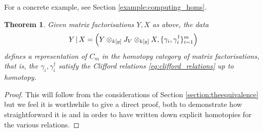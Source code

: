 \documentclass[english,letter paper,12pt,leqno]{article}
\newtheorem{theorem}{Theorem}[section]
\theoremstyle{example}
\numberwithin{equation}{section}
\def\be{\begin{equation}}
\def\ee{\end{equation}}
\begin{document}
For a concrete example, see Section \ref{example:computing_homs}.

\begin{theorem} Given matrix factorisations $Y,X$ as above, the data
\be
Y \l X = \left( Y \otimes_{k[y]} J_V \otimes_{k[y]} X, \{ \gamma_i, \gamma_i^\dagger \}_{i=1}^m \right)
\ee
defines a representation of $C_m$ in the homotopy category of matrix factorisations, that is, the $\gamma_i, \gamma_i^\dagger$ satisfy the Clifford relations \eqref{eq:clifford_relations}
up to homotopy.
\end{theorem}
\begin{proof}
This will follow from the considerations of Section \ref{section:theequivalence} but we feel it is worthwhile to give a direct proof, both to demonstrate how straightforward it is and in order to have written down explicit homotopies for the various relations.


\end{proof}
\end{document}
